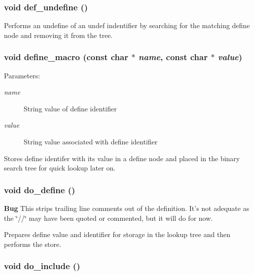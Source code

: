 \subsubsection{\setlength{\rightskip}{0pt plus 5cm}void def\_\-undefine ()\hspace{0.3cm}{\tt  [static]}}\label{pplexer_8c_a133}


Performs an undefine of an undef indentifier by searching for the matching define node and removing it from the tree. 
\subsubsection{\setlength{\rightskip}{0pt plus 5cm}void define\_\-macro (const char $\ast$ {\em name}, const char $\ast$ {\em value})}\label{pplexer_8c_a143}


\begin{Desc}
\item[Parameters:]
\begin{description}
\item[{\em name}]String value of define identifier \item[{\em value}]String value associated with define identifier\end{description}
\end{Desc}
Stores define identifer with its value in a define node and placed in the binary search tree for quick lookup later on. 
\subsubsection{\setlength{\rightskip}{0pt plus 5cm}void do\_\-define ()\hspace{0.3cm}{\tt  [static]}}\label{pplexer_8c_a134}


\begin{Desc}
\item[{\bf Bug}]This strips trailing line comments out of the definition. It's not adequate as the \char`\"{}//\char`\"{} may have been quoted or commented, but it will do for now.\end{Desc}
Prepares define value and identifier for storage in the lookup tree and then performs the store. 
\subsubsection{\setlength{\rightskip}{0pt plus 5cm}void do\_\-include ()\hspace{0.3cm}{\tt  [static]}}\label{pplexer_8c_a137}


